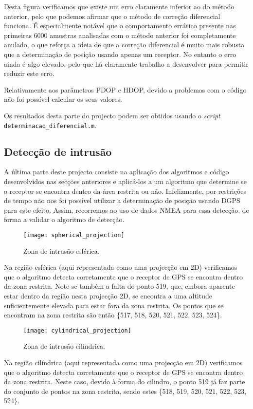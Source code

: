 \documentclass{article}
\begin{document}
Desta figura verificamos que existe um erro claramente inferior ao do método anterior, pelo que podemos afirmar que o método de correção diferencial funciona. É especialmente notável que o comportamento errático presente nas primeiras 6000 amostras analisadas com o método anterior foi completamente anulado, o que reforça a ideia de que a correção diferencial é muito mais robusta que a determinação de posição usando apenas um receptor. No entanto o erro ainda é algo elevado, pelo que há claramente trabalho a desenvolver para permitir reduzir este erro.

Relativamente aos parâmetros PDOP e HDOP, devido a problemas com o código não foi possível calcular os seus valores.

Os resultados desta parte do projecto podem ser obtidos usando o \textit{script} \texttt{determinacao\_diferencial.m}.





\subsection{Detecção de intrusão}
A última parte deste projecto consiste na aplicação dos algoritmos e código desenvolvidos nas secções anteriores e aplicá-los a um algoritmo que determine se o receptor se encontra dentro da área restrita ou não. Infelizmente, por restrições de tempo não nos foi possível utilizar a determinação de posição usando DGPS para este efeito. Assim, recorremos ao uso de dados NMEA para essa detecção, de forma a validar o algoritmo de detecção. 

\begin{figure}[!ht]
\centering
\texttt{[image: spherical\_projection]}
\caption{Zona de intrusão esférica.}
\label{fig:erro_simples_UB1_sph}
\end{figure}

\newpage
Na região esférica (aqui representada como uma projecção em 2D) verificamos que o algoritmo detecta corretamente que o receptor de GPS se encontra dentro da zona restrita. Note-se também a falta do ponto 519, que, embora aparente estar dentro da região nesta projecção 2D, se encontra a uma altitude suficientemente elevada para estar fora da zona restrita. Os pontos que se encontram na zona restrita são então \{517, 518, 520, 521, 522, 523, 524\}.

\newpage

\begin{figure}[!ht]
\centering
\texttt{[image: cylindrical\_projection]}
\caption{Zona de intrusão cilíndrica.}
\label{fig:erro_simples_UB1_cyl}
\end{figure}
Na região cilíndrica (aqui representada como uma projecção em 2D) verificamos que o algoritmo detecta corretamente que o receptor de GPS se encontra dentro da zona restrita. Neste caso, devido à forma do cilindro, o ponto 519 já faz parte do conjunto de pontos na zona restrita, sendo estes \{518, 519, 520, 521, 522, 523, 524\}.
\end{document}
